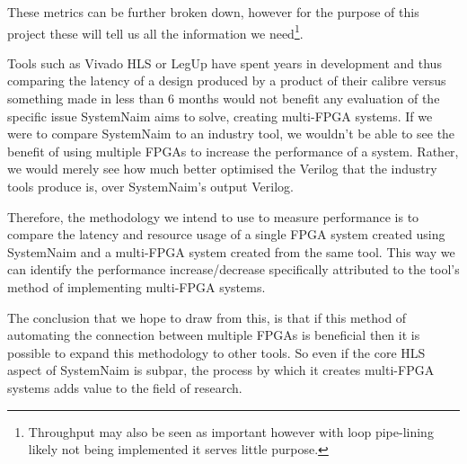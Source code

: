These metrics can be further broken down, however for the purpose of this project these will tell us all the information we need\footnote{Throughput may also be seen as important however with loop pipe-lining likely not being implemented it serves little purpose.}.

Tools such as Vivado HLS or LegUp have spent years in development and thus comparing the latency of a design produced by a product of their calibre versus something made in less than 6 months would not benefit any evaluation of the specific issue SystemNaim aims to solve, creating multi-FPGA systems. If we were to compare SystemNaim to an industry tool, we wouldn't be able to see the benefit of using multiple FPGAs to increase the performance of a system. Rather, we would merely see how much better optimised the Verilog that the industry tools produce is, over SystemNaim's output Verilog.

Therefore, the methodology we intend to use to measure performance is to compare the latency and resource usage of a single FPGA system created using SystemNaim and a multi-FPGA system created from the same tool. This way we can identify the performance increase/decrease specifically attributed to the tool's method of implementing multi-FPGA systems. 

The conclusion that we hope to draw from this, is that if this method of automating the connection between multiple FPGAs is beneficial then it is possible to expand this methodology to other tools. So even if the core HLS aspect of SystemNaim is subpar, the process by which it creates multi-FPGA systems adds value to the field of research.






